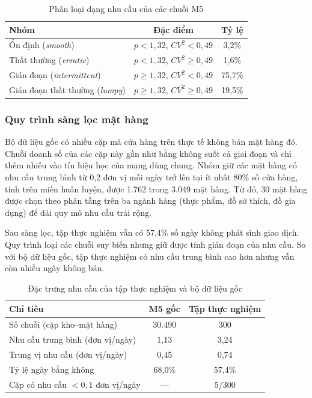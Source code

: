 \begin{table}[H]
    \centering
    \caption{Phân loại dạng nhu cầu của các chuỗi M5}
    \label{tab:phanloainhucau}
    \begin{tabular}{|l|c|c|}
        \hline
        Nhóm & Đặc điểm & Tỷ lệ \\
        \hline
        Ổn định (\textit{smooth})       & $p < 1{,}32$, $CV^2 < 0{,}49$   & 3,2\%  \\ \hline
        Thất thường (\textit{erratic})  & $p < 1{,}32$, $CV^2 \ge 0{,}49$ & 1,6\%  \\ \hline
        Gián đoạn (\textit{intermittent}) & $p \ge 1{,}32$, $CV^2 < 0{,}49$ & 75,7\% \\ \hline
        Gián đoạn thất thường (\textit{lumpy}) & $p \ge 1{,}32$, $CV^2 \ge 0{,}49$ & 19,5\% \\
        \hline
    \end{tabular}
\end{table}

\subsubsection{Quy trình sàng lọc mặt hàng}

Bộ dữ liệu gốc có nhiều cặp mà cửa hàng trên thực tế không bán mặt hàng đó. Chuỗi doanh số của các cặp này gần như bằng không suốt cả giai đoạn và chỉ thêm nhiễu vào tín hiệu học của mạng dùng chung. Nhóm giữ các mặt hàng có nhu cầu trung bình từ 0,2 đơn vị mỗi ngày trở lên tại ít nhất 80\% số cửa hàng, tính trên miền huấn luyện, được 1.762 trong 3.049 mặt hàng. Từ đó, 30 mặt hàng được chọn theo phân tầng trên ba ngành hàng (thực phẩm, đồ sở thích, đồ gia dụng) để dải quy mô nhu cầu trải rộng.

Sau sàng lọc, tập thực nghiệm vẫn có 57,4\% số ngày không phát sinh giao dịch. Quy trình loại các chuỗi suy biến nhưng giữ được tính gián đoạn của nhu cầu. So với bộ dữ liệu gốc, tập thực nghiệm có nhu cầu trung bình cao hơn nhưng vẫn còn nhiều ngày không bán.

\begin{table}[H]
    \centering
    \caption{Đặc trưng nhu cầu của tập thực nghiệm và bộ dữ liệu gốc}
    \label{tab:dacTrungDuLieu}
    \begin{tabular}{|l|c|c|}
        \hline
        Chỉ tiêu & M5 gốc & Tập thực nghiệm \\
        \hline
        Số chuỗi (cặp kho--mặt hàng) & 30.490 & 300 \\ \hline
        Nhu cầu trung bình (đơn vị/ngày) & 1,13 & 3,24 \\ \hline
        Trung vị nhu cầu (đơn vị/ngày)   & 0,45 & 0,74 \\ \hline
        Tỷ lệ ngày bằng không        & 68,0\% & 57,4\% \\ \hline
        Cặp có nhu cầu $< 0{,}1$ đơn vị/ngày & --- & $5/300$ \\
        \hline
    \end{tabular}
\end{table}

